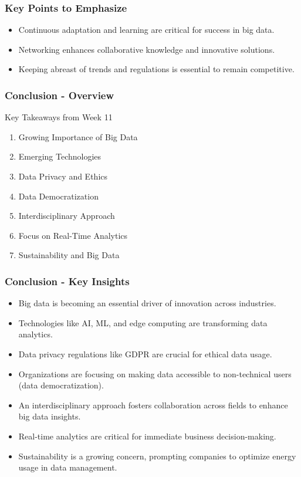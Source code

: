 \documentclass[aspectratio=169]{beamer}
\begin{document}
\begin{frame}[fragile]
    \frametitle{Key Points to Emphasize}
    \begin{itemize}
        \item Continuous adaptation and learning are critical for success in big data.
        \item Networking enhances collaborative knowledge and innovative solutions.
        \item Keeping abreast of trends and regulations is essential to remain competitive.
    \end{itemize}
\end{frame}

\begin{frame}[fragile]
    \frametitle{Conclusion - Overview}
    \begin{block}{Key Takeaways from Week 11}
        \begin{enumerate}
            \item Growing Importance of Big Data
            \item Emerging Technologies
            \item Data Privacy and Ethics
            \item Data Democratization
            \item Interdisciplinary Approach
            \item Focus on Real-Time Analytics
            \item Sustainability and Big Data
        \end{enumerate}
    \end{block}
\end{frame}

\begin{frame}[fragile]
    \frametitle{Conclusion - Key Insights}
    \begin{itemize}
        \item Big data is becoming an essential driver of innovation across industries.
        \item Technologies like AI, ML, and edge computing are transforming data analytics.
        \item Data privacy regulations like GDPR are crucial for ethical data usage.
        \item Organizations are focusing on making data accessible to non-technical users (data democratization).
        \item An interdisciplinary approach fosters collaboration across fields to enhance big data insights.
        \item Real-time analytics are critical for immediate business decision-making.
        \item Sustainability is a growing concern, prompting companies to optimize energy usage in data management.
    \end{itemize}
\end{frame}
\end{document}
